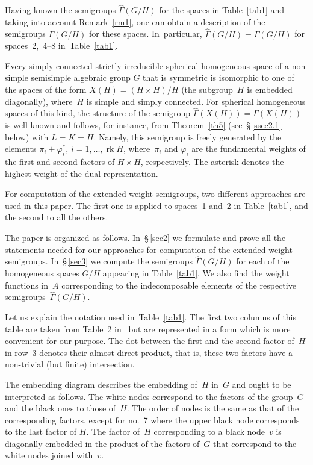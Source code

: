 \documentclass[12pt]{amsart}
\theoremstyle{definition}
\theoremstyle{remark}
\begin{document}
Having known the semigroups $\widehat\Gamma(G/H)$ for the spaces in
Table~\ref{tab1} and taking into account Remark~\ref{rm1}, one can
obtain a description of the semigroups $\Gamma(G/H)$ for these
spaces. In~particular, $\widehat\Gamma(G/H)=\Gamma(G/H)$ for
spaces~2,~4--8 in~Table~\ref{tab1}.

Every simply connected strictly irreducible spherical homogeneous
space of a non-simple semisimple algebraic group $G$ that is
symmetric is isomorphic to one of the spaces of the form
$X(H)=(H\times H)/H$ (the subgroup~$H$ is embedded diagonally),
where~$H$ is simple and simply connected. For spherical homogeneous
spaces of this kind, the structure of the semigroup
$\widehat\Gamma(X(H))=\Gamma(X(H))$ is well known and follows, for
instance, from Theorem~\ref{th5} (see~\S\,\ref{ssec2.1} below) with
$L=K=H$. Namely, this semigroup is freely generated by the elements
$\pi_i+\varphi_i^*$, $i=1,\dots,{\operatorname{rk}} H$, where~$\pi_i$ and
$\varphi_i$ are the fundamental weights of the first and second
factors of $H\times H$, respectively. The asterisk denotes the
highest weight of the dual representation.

For computation of the extended weight semigroups, two different
approaches are used in this paper. The first one is applied to
spaces~1 and~2 in Table~\ref{tab1}, and the second to all the
others.

The paper is organized as follows. In~\S\,\ref{sec2} we formulate
and prove all the statements needed for our approaches for
computation of the extended weight semigroups. In~\S\,\ref{sec3} we
compute the semigroups $\widehat\Gamma(G/H)$ for each of the
homogeneous spaces $G/H$ appearing in Table~\ref{tab1}. We also find
the weight functions in~$A$ corresponding to the indecomposable
elements of the respective semigroups~$\widehat\Gamma(G/H)$.

Let us explain the notation used in~Table~\ref{tab1}. The first two
columns of this table are taken from Table~2 in~\cite{12} but are
represented in a form which is more convenient for our purpose. The
dot between the first and the second factor of~$H$ in row~3 denotes
their almost direct product, that is, these two factors have a
non-trivial (but finite) intersection.

The embedding diagram describes the embedding of~$H$ in~$G$ and
ought to be interpreted as follows. The white nodes correspond to
the factors of the group~$G$ and the black ones to those of~$H$. The
order of nodes is the same as that of the corresponding factors,
except for no.~7 where the upper black node corresponds to the last
factor of $H$. The factor of~$H$ corresponding to a black node~$v$
is diagonally embedded in the product of the factors of~$G$ that
correspond to the white nodes joined with~$v$.
\end{document}
